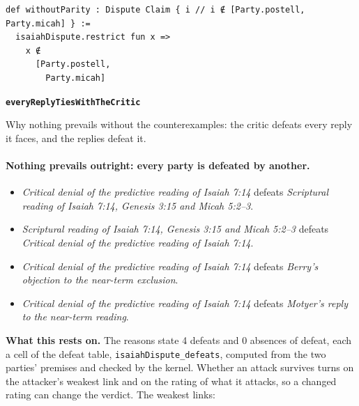 \documentclass[11pt]{article}
\begin{document}
{\small\begin{verbatim}
def withoutParity : Dispute Claim { i // i ∉ [Party.postell, Party.micah] } :=
  isaiahDispute.restrict fun x =>
    x ∉
      [Party.postell,
        Party.micah]
\end{verbatim}}
\par\medskip\noindent\textbf{\texttt{every\allowbreak{}Reply\allowbreak{}Ties\allowbreak{}With\allowbreak{}The\allowbreak{}Critic}}\par\nobreak\noindent
Why nothing prevails without the counterexamples: the critic defeats every reply it faces, and the replies defeat it.

\paragraph{Nothing prevails outright: every party is defeated by another.}
\begin{itemize}
\item \emph{Critical denial of the predictive reading of Isaiah 7:14} defeats \emph{Scriptural reading of Isaiah 7:14, Genesis 3:15 and Micah 5:2–3}.
\item \emph{Scriptural reading of Isaiah 7:14, Genesis 3:15 and Micah 5:2–3} defeats \emph{Critical denial of the predictive reading of Isaiah 7:14}.
\item \emph{Critical denial of the predictive reading of Isaiah 7:14} defeats \emph{Berry's objection to the near-term exclusion}.
\item \emph{Critical denial of the predictive reading of Isaiah 7:14} defeats \emph{Motyer's reply to the near-term reading}.
\end{itemize}
\par\noindent\textbf{What this rests on.} The reasons state 4 defeats and 0 absences of defeat, each a cell of the defeat table, \texttt{isaiah\allowbreak{}Dispute\_\allowbreak{}defeats}, computed from the two parties' premises and checked by the kernel. Whether an attack survives turns on the attacker's weakest link and on the rating of what it attacks, so a changed rating can change the verdict. The weakest links:
\end{document}
